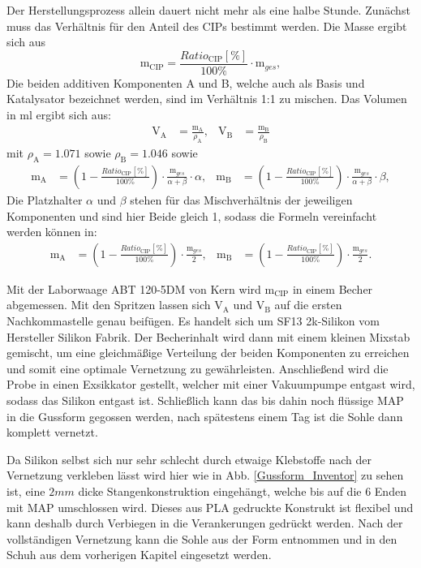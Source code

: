 Der Herstellungsprozess allein dauert nicht mehr als eine halbe Stunde. Zunächst muss das Verhältnis für den Anteil des CIPs bestimmt werden. Die Masse ergibt sich aus
\begin{equation}
\text{m}_{\text{CIP}} = \frac{Ratio_{\text{CIP}} [\%]}{100\%}\cdot\text{m}_{ges},
\end{equation}
Die beiden additiven Komponenten A und B, welche auch als Basis und Katalysator bezeichnet werden, sind im Verhältnis 1:1 zu mischen. Das Volumen in \unit{ml} ergibt sich aus:
\begin{align}
\text{V}_\text{A} &= \frac{\text{m}_\text{A}}{\rho_\text{A}} ,& 
\text{V}_\text{B} &= \frac{\text{m}_\text{B}}{\rho_\text{B}}
\end{align}
mit $\rho_\text{A} = 1.071$ sowie $\rho_\text{B} = 1.046$ sowie
\begin{align}	
\text{m}_\text{A} &= \left( 1- \frac{Ratio_{\text{CIP}} [\%]}{100\%}\right)\cdot
\frac{\text{m}_{ges}}{\alpha + \beta}\cdot\alpha ,&
\text{m}_\text{B} &= \left( 1- \frac{Ratio_{\text{CIP}} [\%]}{100\%}\right)\cdot
\frac{\text{m}_{ges}}{\alpha + \beta}\cdot\beta,
\end{align}
Die Platzhalter $\alpha$ und $\beta$ stehen für das Mischverhältnis der jeweiligen Komponenten und sind hier Beide gleich 1, sodass die Formeln vereinfacht werden können in:
\begin{align}	
\text{m}_\text{A} &= \left( 1- \frac{Ratio_{\text{CIP}} [\%]}{100\%}\right)\cdot
\frac{\text{m}_{ges}}{2} ,&
\text{m}_\text{B} &= \left( 1- \frac{Ratio_{\text{CIP}} [\%]}{100\%}\right)\cdot
\frac{\text{m}_{ges}}{2}.
\end{align}

Mit der Laborwaage ABT 120-5DM von Kern wird $\text{m}_\text{CIP}$ in einem Becher abgemessen. Mit den Spritzen lassen sich $\text{V}_\text{A}$ und $\text{V}_\text{B}$ auf die ersten Nachkommastelle genau beifügen. Es handelt sich um SF13 2k-Silikon vom Hersteller Silikon Fabrik. Der Becherinhalt wird dann mit einem kleinen Mixstab gemischt, um eine gleichmäßige Verteilung der beiden Komponenten zu erreichen und somit eine optimale Vernetzung zu gewährleisten. Anschließend wird die Probe in einen Exsikkator gestellt, welcher mit einer Vakuumpumpe entgast wird, sodass das Silikon entgast ist. Schließlich kann das bis dahin noch flüssige MAP in die Gussform gegossen werden, nach spätestens einem Tag ist die Sohle dann komplett vernetzt. 

Da Silikon selbst sich nur sehr schlecht durch etwaige Klebstoffe nach der Vernetzung verkleben lässt wird hier wie in Abb. \ref{Gussform_Inventor} zu sehen ist, eine $2\unit{mm}$ dicke Stangenkonstruktion eingehängt, welche bis auf die 6 Enden mit MAP umschlossen wird. Dieses aus PLA gedruckte Konstrukt ist flexibel und kann deshalb durch Verbiegen in die Verankerungen gedrückt werden. Nach der vollständigen Vernetzung kann die Sohle aus der Form entnommen und in den Schuh aus dem vorherigen Kapitel eingesetzt werden. 

